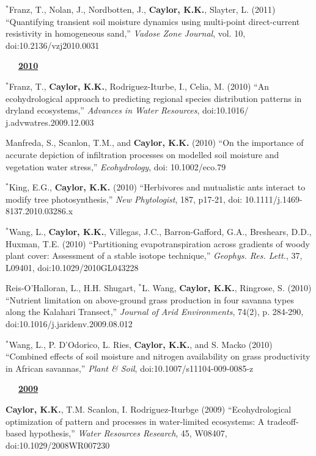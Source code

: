 \documentclass[10pt]{report}
\begin{document}
\begin{etaremune}
\item $^{*}$Franz, T., Nolan, J., Nordbotten, J., \textbf{Caylor, K.K.}, Slayter, L. (2011) ``Quantifying transient soil moisture dynamics using multi-point direct-current resistivity in homogeneous sand,'' {\em Vadose Zone Journal}, vol. 10, doi:10.2136/vzj2010.0031

\mbox{\ \ \ \underline{\textbf{2010}}}

\item $^{*}$Franz, T., \textbf{Caylor, K.K.}, Rodriguez-Iturbe, I., Celia, M. (2010) ``An ecohydrological approach to predicting regional species distribution patterns in dryland ecosystems,'' {\em Advances in Water Resources}, doi:10.1016/ j.advwatres.2009.12.003

\item Manfreda, S., Scanlon, T.M., and \textbf{Caylor, K.K.} (2010) ``On the importance of accurate depiction of infiltration processes on modelled soil moisture and vegetation water stress,'' {\em Ecohydrology}, doi: 10.1002/eco.79

\item $^{*}$King, E.G., \textbf{Caylor, K.K.} (2010) ``Herbivores and mutualistic ants interact to modify tree photosynthesis,'' {\em New Phytologist}, 187, p17-21, doi: 10.1111/j.1469-8137.2010.03286.x

\item $^{*}$Wang, L.,  \textbf{Caylor, K.K.}, Villegas, J.C., Barron-Gafford, G.A.,  Breshears, D.D.,  Huxman, T.E. (2010) ``Partitioning evapotranspiration across gradients of woody plant cover: Assessment of a stable isotope technique,'' {\em Geophys. Res. Lett.}, 37, L09401, doi:10.1029/2010GL043228

\item Reis-O'Halloran, L., H.H. Shugart, $^{*}$L. Wang, \textbf{Caylor, K.K.}, Ringrose, S. (2010) ``Nutrient limitation on above-ground grass production in four savanna types along the Kalahari Transect,'' {\em Journal of Arid Environments}, 74(2), p. 284-290, doi:10.1016/j.jaridenv.2009.08.012

\item $^{*}$Wang, L., P. D'Odorico, L. Ries, \textbf{Caylor, K.K.}, and S. Macko (2010) ``Combined effects of soil moisture and nitrogen availability on grass productivity in African savannas,'' {\em Plant \& Soil}, doi:10.1007/s11104-009-0085-z

\mbox{\ \ \ \underline{\textbf{2009}}}
 
\item \textbf{Caylor, K.K.}, T.M. Scanlon, I. Rodriguez-Iturbge (2009) ``Ecohydrological optimization of pattern and processes in water-limited ecosystems: A tradeoff-based hypothesis,'' \emph{Water Resources Research}, 45, W08407, doi:10.1029/2008WR007230


\end{etaremune}
\end{document}
